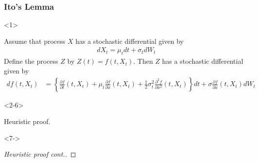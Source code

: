 \documentclass[10pt]{beamer}
\begin{document}
\begin{frame}[t]
  \frametitle{Ito's Lemma}
  \begin{onlyenv}<1>
  \begin{theorem}
    Assume that process $X$ has a stochastic differential given by 
    \begin{align*}
      dX_t = \mu_t dt + \sigma_t dW_t
    \end{align*}
    Define the process $Z$ by $Z(t) = f(t, X_t)$. Then $Z$ has a stochastic differential given by
    \begin{align*}
      df(t, X_t) &= \left\{\frac{\partial f}{\partial t}(t, X_t) + \mu_t \frac{\partial f}{\partial x}(t,X_t) + \frac{1}{2}\sigma^2_t\frac{\partial^2 f}{\partial x^2}(t,X_t)\right\}dt + \sigma \frac{\partial f}{\partial x}(t, X_t)dW_t
    \end{align*}
  \end{theorem}
  \end{onlyenv}
  \begin{onlyenv}<2-6>
    \begin{block}{Heuristic proof.}
    \end{block}
  \end{onlyenv}
  \begin{onlyenv}<7->
    \begin{proof}[Heuristic proof cont.]
\end{proof}
\end{onlyenv}
\end{frame}
\end{document}
